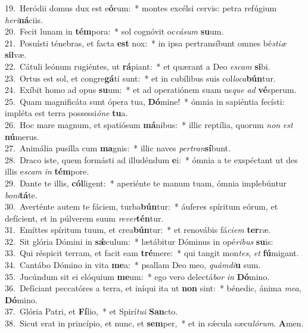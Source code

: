 {19.~}Heródii domus dux est e\textbf{ó}rum:~* montes excélsi cervis: petra refúgium \textit{he}\textit{ri}\textbf{ná}ciis.\\
{20.~}Fecit lunam in \textbf{tém}pora:~* sol cognóvit oc\textit{cá}\textit{sum} \textbf{su}um.\\
{21.~}Posuísti ténebras, et facta \textbf{est} nox:~* in ipsa pertransíbunt omnes bé\textit{sti}\textit{æ} \textbf{sil}væ.\\
{22.~}Cátuli leónum rugiéntes, ut \textbf{rá}piant:~* et quærant a Deo \textit{e}\textit{scam} \textbf{si}bi.\\
{23.~}Ortus est sol, et congre\textbf{gá}ti sunt:~* et in cubílibus suis col\textit{lo}\textit{ca}\textbf{bún}tur.\\
{24.~}Exíbit homo ad opus \textbf{su}um:~* et ad operatiónem suam us\textit{que} \textit{ad} \textbf{vé}sperum.\\
{25.~}Quam magnificáta sunt ópera tua, \textbf{Dó}mine!~* ómnia in sapiéntia fecísti: impléta est terra possessi\textit{ó}\textit{ne} \textbf{tu}a.\\
{26.~}Hoc mare magnum, et spatiósum \textbf{má}nibus:~* illic reptília, quorum \textit{non} \textit{est} \textbf{nú}merus.\\
{27.~}Animália pusílla cum \textbf{ma}gnis:~* illic naves \textit{per}\textit{tran}\textbf{sí}bunt.\\
{28.~}Draco iste, quem formásti ad illudéndum \textbf{e}i:~* ómnia a te exspéctant ut des illis e\textit{scam} \textit{in} \textbf{tém}pore.\\
{29.~}Dante te illis, \textbf{cól}ligent:~* aperiénte te manum tuam, ómnia implebúntur \textit{bo}\textit{ni}\textbf{tá}te.\\
{30.~}Averténte autem te fáciem, turba\textbf{bún}tur:~* áuferes spíritum eórum, et defícient, et in púlverem suum \textit{re}\textit{ver}\textbf{tén}tur.\\
{31.~}Emíttes spíritum tuum, et crea\textbf{bún}tur:~* et renovábis fá\textit{ci}\textit{em} \textbf{ter}ræ.\\
{32.~}Sit glória Dómini in \textbf{sǽ}culum:~* lætábitur Dóminus in opé\textit{ri}\textit{bus} \textbf{su}is:\\
{33.~}Qui réspicit terram, et facit eam \textbf{tré}mere:~* qui tangit mon\textit{tes}, \textit{et} \textbf{fú}migant.\\
{34.~}Cantábo Dómino in vita \textbf{me}a:~* psallam Deo meo, \textit{quám}\textit{di}\textbf{u} sum.\\
{35.~}Jucúndum sit ei elóquium \textbf{me}um:~* ego vero delectá\textit{bor} \textit{in} \textbf{Dó}mino.\\
{36.~}Defíciant peccatóres a terra, et iníqui ita ut \textbf{non} sint:~* bénedic, ánima \textit{me}\textit{a}, \textbf{Dó}mino.\\
{37.~}Glória Patri, et \textbf{Fí}lio,~* et Spirí\textit{tu}\textit{i} \textbf{San}cto.\\
{38.~}Sicut erat in princípio, et nunc, et \textbf{sem}per,~* et in sǽcula sæcu\textit{ló}\textit{rum}. \textbf{A}men.\\
